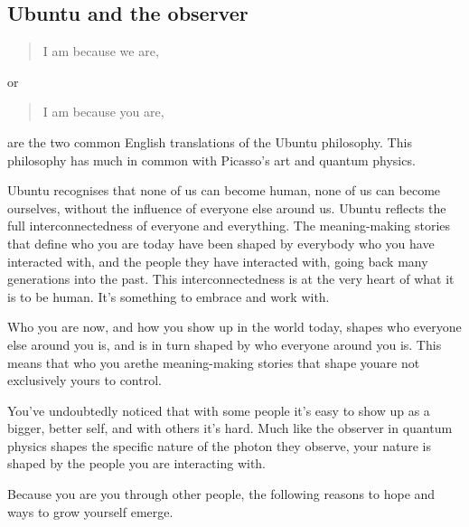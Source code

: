\subsection{Ubuntu and the observer}
\label{section:ubuntu}
\begin{quote} I am because we are, \end{quote} or \begin{quote} I am because you are, \end{quote} are the two common English translations of the Ubuntu philosophy. This philosophy has much in common with Picasso's  art and quantum physics.


Ubuntu recognises that none of us can become human, none of us can become ourselves, without the influence of everyone else around us. Ubuntu   reflects the full interconnectedness of everyone and everything. The meaning\hyp{}making stories that define who you are today have been shaped by everybody who you have interacted with, and the people they have interacted with, going back many generations into the past. This interconnectedness is at the very heart of what it is to be human. It’s something to embrace and work with.


Who you are now, and how you show up in the world today, shapes who everyone else around you is, and is in turn shaped by who everyone around you is. This means that who you are\textemdash the meaning\hyp{}making stories that shape you\textemdash are not exclusively yours to control. 


You've undoubtedly noticed that with some people it's easy to show up as a bigger, better self, and with others it's hard. Much like the observer in quantum physics  shapes the specific nature of the photon they observe, your nature is shaped by the people you are interacting with.


Because you are you through other people, the following reasons to hope  and ways to grow yourself emerge.


